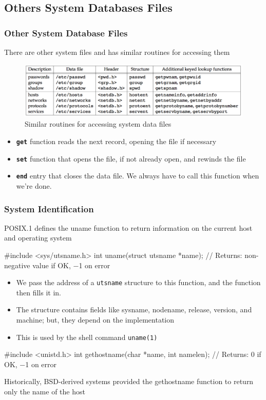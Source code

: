 \documentclass[newPxFont,sthlmFooter,nooffset]{beamer}
\begin{document}
\subsection{Others System Databases Files}

\begin{frame}[t]
  \frametitle{Other System Database Files}
There are other system files and has similar routines for accessing them


\begin{figure}[h]
  \centering
  \includegraphics[width=\textwidth]{figure/fig6-6_similar.png}
  \caption{Similar routines for accessing system data files}
\end{figure}


\begin{itemize}
\item \textbf{\texttt{get}} function reads the next record, opening the file if necessary
\item \textbf{\texttt{set}} function that opens the file, if not already open, and rewinds the file
\item \textbf{\texttt{end}} entry that closes the data file. We always have to call this function when we're done.
\end{itemize}

\end{frame}


\begin{frame}[containsverbatim,t]
  \frametitle{System Identification}
POSIX.1 defines the uname function to return information on the current host and operating system

\begin{codedef}
#include <sys/utsname.h>
int uname(struct utsname *name);
// Returns: non-negative value if OK, −1 on error  
\end{codedef}

{\footnotesize
  \begin{itemize}
  \item We pass the address of a \texttt{utsname} structure to this function, and the function then fills it in.
  \item The structure contains fields like sysname, nodename, release, version, and machine; but, they depend on the implementation
  \item This is used by the shell command \texttt{uname(1)}
  \end{itemize}
}


\begin{codedef}
#include <unistd.h>
int gethostname(char *name, int namelen);
// Returns: 0 if OK, −1 on error
\end{codedef}
Historically, BSD-derived systems provided the gethostname function to return only the name of the host


\end{frame}
\end{document}
